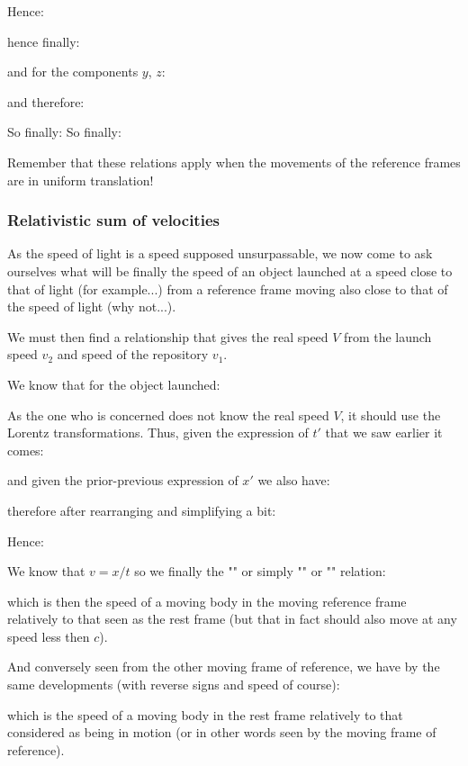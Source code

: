 	Hence:
	
	hence finally:
	
	and for the components $y$, $z$:
	
	and therefore:
	
	So finally:
	So finally:
	
	Remember that these relations apply when the movements of the reference frames are in uniform translation!
	
	\subsubsection{Relativistic sum of velocities}
	As the speed of light is a speed supposed unsurpassable, we now come to ask ourselves what will be finally the speed of an object launched at a speed close to that of light (for example...) from a reference frame moving also close to that of the speed of light (why not...).

	We must then find a relationship that gives the real speed $V$ from the launch speed $v_2$ and speed of the repository $v_1$.

	We know that for the object launched:
	
	As the one who is concerned does not know the real speed $V$, it should use the Lorentz transformations. Thus, given the expression of $t'$ that we saw earlier it comes:
	
	and given the prior-previous expression of $x'$ we also have:
	
	therefore after rearranging and simplifying a bit:
	
	Hence:
	
	We know that $v=x/t$ so we finally the "" or simply "" or "" relation:
	
	which is then the speed of a moving body in the moving reference frame relatively to that seen as the rest frame (but that in fact should also move at any speed less then $c$).

	And conversely seen from the other moving frame of reference, we have by the same developments (with reverse signs and speed of course):
	
	which is the speed of a moving body in the rest frame relatively to that considered as being in motion (or in other words seen by the moving frame of reference).
	
